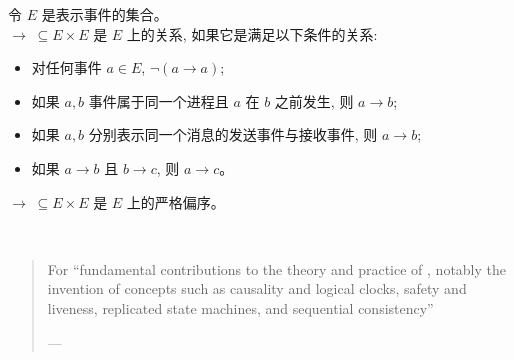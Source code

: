 
\begin{frame}{}
\end{frame}

\begin{frame}{}
  \begin{definition}
    令 $E$ 是表示事件的集合。\\[3pt]
    $\to \;\subseteq E \times E$ 是 $E$ 上的关系,
    如果它是满足以下条件的关系: \\[5pt]
    \begin{itemize}
      \setlength{\itemsep}{8pt}
      \item 对任何事件 $a \in E$, $\lnot (a \to a)$;
      \item 如果 $a, b$ 事件属于同一个进程且 $a$ 在 $b$ 之前发生, 则 $a \to b$;
      \item 如果 $a, b$ 分别表示同一个消息的发送事件与接收事件, 则 $a \to b$;
      \item 如果 $a \to b$ 且 $b \to c$, 则 $a \to c$。
    \end{itemize}
  \end{definition}

  \pause
  \vspace{0.30cm}
  \begin{theorem}
    $\to \;\subseteq E \times E$ 是 $E$ 上的严格偏序。
  \end{theorem}
\end{frame}

\begin{frame}{}

  \begin{center}
     \\[3pt]
  \end{center}

  \begin{quote}
      For ``fundamental contributions to the theory and practice of
      ,
      notably the invention of concepts
      such as causality and logical clocks,
      safety and liveness, replicated state machines,
      and sequential consistency''

    \hfill  --- 
  \end{quote}
\end{frame}

\begin{frame}{}
  \begin{center}
  \end{center}
\end{frame}
